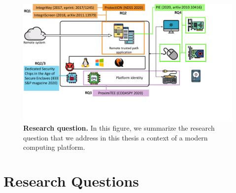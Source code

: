 \begin{figure}[t]
  \centering
    \includegraphics[trim={0 4cm 4cm 0},clip,width=\linewidth]{chapters/introduction/images/RQ.pdf}
    \caption[Research questions]{\textbf{Research question.} In this figure, we summarize the research question that we address in this thesis a context of a modern computing platform.}
    \label{fig:rq}
\end{figure}

\section{Research Questions}


